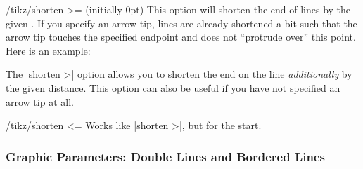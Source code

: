 \begin{key}{/tikz/shorten >= (initially 0pt)}
  This option will shorten the end of lines by the given
  . If you specify an arrow tip, lines are already
  shortened a bit such that the arrow tip touches the specified endpoint
  and does not ``protrude over'' this point. Here is an example:

\begin{codeexample}[]
\end{codeexample}

  The |shorten >| option allows you to shorten the end on the line
  \emph{additionally} by the given distance. This option can also be
  useful if you have not specified an arrow tip at all.

\begin{codeexample}[]
\end{codeexample}
\end{key}


\begin{key}{/tikz/shorten <=}
  Works like |shorten >|, but for the start.
\end{key}



\subsubsection{Graphic Parameters: Double Lines and Bordered Lines}

